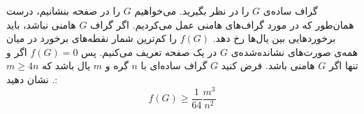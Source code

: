 \EXERCISE
گراف ساده‌ی
$G$
را در نظر بگیرید. می‌خواهیم
$G$
را در صفحه بنشانیم، درست همان‌طور که در مورد گراف‌های هامنی عمل می‌کردیم. اگر گراف
$G$
هامنی نباشد، باید برخوردهایی بین یال‌ها رخ دهد.
$f(G)$
را کم‌ترین شمار نقطه‌های برخورد در میان همه‌ی صورت‌های نشانده‌شده‌ی
$G$
در یک صفحه تعریف می‌کنیم. پس
$f(G) = 0$
اگر و تنها اگر
$G$
هامنی باشد. فرض کنید
$G$
گراف ساده‌ای با
$n$
گره و
$m$
یال باشد که
$m \geq 4n$
. نشان دهید:
$$f(G) \geq \frac{1}{64}\frac{m^3}{n^2}$$